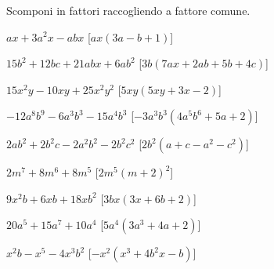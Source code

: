 \subsubsection*{}

\begin{esercizio}[\Ast]
\label{ese:div.009}
Scomponi in fattori raccogliendo a fattore comune.
\begin{enumeratea}
 \item $ax+3a^{2}x-abx$ \hfill [$ax(3a-b+1)$]
 \item $15b^{2}+12bc+21abx+6ab^{2}$ \hfill [$3b(7ax+2ab+5b+4c)$]
 \item $15x^{2}y-10xy+25x^{2}y^{2}$ \hfill [$5xy(5xy+3x-2)$]
 \item $-12a^{8}b^{9}-6a^{3}b^{3}-15a^{4}b^{3}$ 
  \hfill [$-3a^{3}b^{3}\left(4a^{5}b^{6}+5a+2\right)$]
 \item $2ab^{2}+2b^{2}c-2a^{2}b^{2}-2b^{2}c^{2}$ 
  \hfill [$2b^{2}(a+c-a^{2}-c^{2})$]
 \item $2m^{7}+8m^{6}+8m^{5}$ 
  \hfill [$2m^{5}\left(m+2\right)^{2}$]
 \item $9x^{2}b+6xb+18xb^{2}$ \hfill [$3bx(3x+6b+2)$]
 \item $20a^{5}+15a^{7}+10a^{4}$ \hfill [$5a^{4}\left(3a^{3}+4a+2\right)$]
 \item $x^{2}b-x^{5}-4x^{3}b^{2}$ \hfill [$-x^{2}\left(x^{3}+4b^{2}x-b\right)$]
\end{enumeratea}
\end{esercizio}

